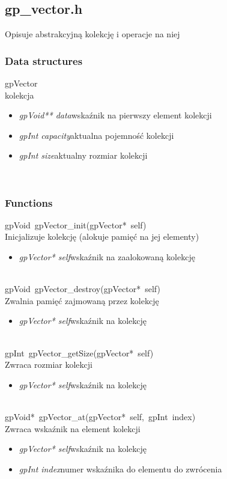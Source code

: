\subsection{gp_vector.h}
Opisuje abstrakcyjną kolekcję i operacje na niej
\subsubsection{Data structures}
\textsf{gpVector}	\\ \indent kolekcja
	\begin{itemize}
		\item \textit{gpVoid** data}\quad wskaźnik na pierwszy element kolekcji
		\item \textit{gpInt capacity}\quad aktualna pojemność kolekcji
		\item \textit{gpInt size}\quad aktualny rozmiar kolekcji
	\end{itemize}
\ \\
\subsubsection{Functions}
\mbox{\textsf{gpVoid gpVector_init(gpVector* self)}} \\ \indent Inicjalizuje kolekcję (alokuje pamięć na jej elementy)
	\begin{itemize}
		\item \textit{gpVector* self}\quad wskaźnik na zaalokowaną kolekcję
	\end{itemize}

 \ \\
\mbox{\textsf{gpVoid gpVector_destroy(gpVector* self)}} \\ \indent Zwalnia pamięć zajmowaną przez kolekcję
	\begin{itemize}
		\item \textit{gpVector* self}\quad wskaźnik na kolekcję
	\end{itemize}

 \ \\
\mbox{\textsf{gpInt gpVector_getSize(gpVector* self)}} \\ \indent Zwraca rozmiar kolekcji
	\begin{itemize}
		\item \textit{gpVector* self}\quad wskaźnik na kolekcję
	\end{itemize}

 \ \\
\mbox{\textsf{gpVoid* gpVector_at(gpVector* self, gpInt index)}} \\ \indent Zwraca wskaźnik na element kolekcji
	\begin{itemize}
		\item \textit{gpVector* self}\quad wskaźnik na kolekcję
		\item \textit{gpInt index}\quad numer wskaźnika do elementu do zwrócenia
	\end{itemize}

